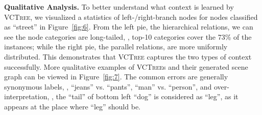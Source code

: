 \documentclass[10pt,twocolumn,letterpaper]{article}
\begin{document}
\noindent\textbf{Qualitative Analysis.}
To better understand what context is learned by \textsc{VCTree}, we visualized a statistics of left-/right-branch nodes for nodes classified as ``street'' in Figure~\ref{fig:6}. From the left pie, the hierarchical relations, we can see the node categories are long-tailed, \ie, top-10 categories cover the 73\% of the instances; while the right pie, the parallel relations, are more uniformly distributed. This demonstrates that \textsc{VCTree} captures the two types of context successfully. More qualitative examples of \textsc{VCTree}s and their generated scene graph can be viewed in Figure~\ref{fig:7}. The common errors are generally synonymous labels, \eg, ``jeans'' vs. ``pants'', ``man'' vs. ``person'', and over-interpretation, \eg, the ``tail'' of bottom left ``dog'' is considered as ``leg'', as it appears at the place where ``leg'' should be.







\begin{table}
\centering
{}
\caption{Single-model accuracies (\%) on VQA2.0 test-dev, where MUTAN and MLB are re-implemented versions from~\cite{bai2018deep}.}
\label{tab:4}
\end{table}
\end{document}
